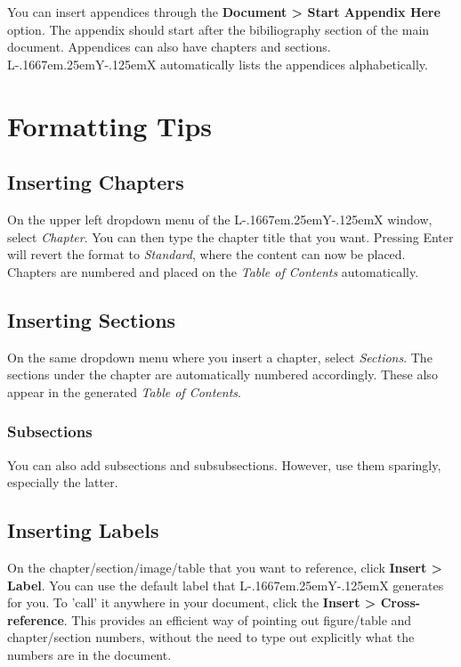 \documentclass[english]{upeeei}
\makeatletter
\providecommand{\LyX}{L\kern-.1667em\lower.25em\hbox{Y}\kern-.125emX\@}
\makeatother
\begin{document}
You can insert appendices through the \textbf{Document \textgreater{}
Start Appendix Here} option. The appendix should start after the bibiliography
section of the main document. Appendices can also have chapters and
sections. \LyX{} automatically lists the appendices alphabetically.

\cleardoublepage{}

\chapter{Formatting Tips}

\section{Inserting Chapters}

On the upper left dropdown menu of the \LyX{} window, select \textit{Chapter}.
You can then type the chapter title that you want. Pressing Enter
will revert the format to \textit{Standard}, where the content can
now be placed. Chapters are numbered and placed on the \textit{Table
of Contents} automatically.

\section{Inserting Sections}

On the same dropdown menu where you insert a chapter, select \textit{Sections}.
The sections under the chapter are automatically numbered accordingly.
These also appear in the generated \textit{Table of Contents}.

\subsection{Subsections}

You can also add subsections and subsubsections. However, use them
sparingly, especially the latter.

\section{Inserting Labels}

On the chapter/section/image/table that you want to reference, click
\textbf{Insert \textgreater{} Label}. You can use the default label
that \LyX{} generates for you. To 'call' it anywhere in your document,
click the \textbf{Insert \textgreater{} Cross-reference}. This provides
an efficient way of pointing out figure/table and chapter/section
numbers, without the need to type out explicitly what the numbers
are in the document.
\end{document}
